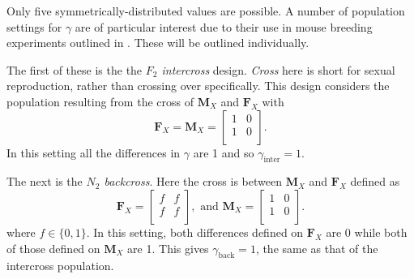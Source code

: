 \documentclass[sts]{imsart}
\newcommand{\m}[1]{\mathbf{#1}}               %
\begin{document}
Only five symmetrically-distributed values are possible. A number of population settings for $\gamma$ are of particular interest due to their use in mouse breeding experiments outlined in \cite{green1966}. These will be outlined individually.

The first of these is the the \textit{$F_2$ intercross} design. \emph{Cross} here is short for sexual reproduction, rather than crossing over specifically. This design considers the population resulting from the cross of $\m{M}_X$ and $\m{F}_X$ with
$$\m{F}_X = \m{M}_X = \begin{bmatrix}
  1 & 0 \\
  1 & 0 \\
\end{bmatrix}.$$
In this setting all the differences in $\gamma$ are 1 and so $\gamma_{\text{inter}} = 1$.

The next is the \textit{$N_2$ backcross}. Here the cross is between $\m{M}_X$ and $\m{F}_X$ defined as
$$\m{F}_X = \begin{bmatrix}
  f & f \\
  f & f \\
\end{bmatrix}, \text{ and }
\m{M}_X = \begin{bmatrix}
  1 & 0 \\
  1 & 0 \\
\end{bmatrix}.$$
where $f \in \{0,1\}$. In this setting, both differences defined on $\m{F}_X$ are 0 while both of those defined on $\m{M}_X$ are 1. This gives $\gamma_{\text{back}} = 1$, the same as that of the intercross population.
\end{document}
